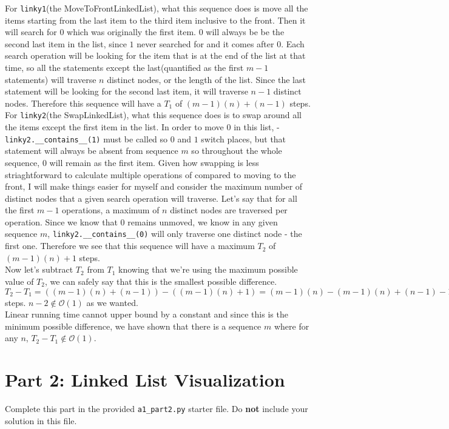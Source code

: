 \documentclass[fontsize=11pt]{article}
\begin{document}
\begin{enumerate}
    For \texttt{linky1}(the MoveToFrontLinkedList), what this sequence does is move all the items starting from the last item to the third item inclusive to the front. Then it will search for $0$ which was originally the first item. $0$ will always be be the second last item in the list, since $1$ never searched for and it comes after $0$. Each search operation will be looking for the item that is at the end of the list at that time, so all the statements except the last(quantified as the first $m-1$ statements) will traverse $n$ distinct nodes, or the length of the list. Since the last statement will be looking for the second last item, it will traverse $n-1$ distinct nodes. Therefore this sequence will have a $T_1$ of $(m-1)(n) + (n-1)$ steps.\\

    For \texttt{linky2}(the SwapLinkedList), what this sequence does is to swap around all the items except the first item in the list. In order to move $0$ in this list, -\texttt{linky2.\_\_contains\_\_(1)} must be called so $0$ and $1$ switch places, but that statement will always be absent from sequence $m$ so throughout the whole sequence, $0$ will remain as the first item. Given how swapping is less striaghtforward to calculate multiple operations of compared to moving to the front, I will make things easier for myself and consider the maximum number of distinct nodes that a given search operation will traverse. Let's say that for all the first $m-1$ operations, a maximum of $n$ distinct nodes are traversed per operation. Since we know that $0$ remains unmoved, we know in any given sequence $m$, \texttt{linky2.\_\_contains\_\_(0)} will only traverse one distinct node - the first one. Therefore we see that this sequence will have a maximum $T_2$ of $(m-1)(n) + 1$ steps.\\

    Now let's subtract $T_2$ from $T_1$ knowing that we're using the maximum possible value of $T_2$, we can safely say that this is the smallest possible difference.\\
    $T_2 - T_1 = ((m-1)(n) + (n-1)) - ((m-1)(n) + 1) = (m-1)(n) - (m-1)(n) + (n-1) - 1 = n - 2$ steps.
    $n - 2 \notin \mathcal{O}(1)$ as we wanted.\\
    Linear running time cannot upper bound by a constant and since this is the minimum possible difference, we have shown that there is a sequence $m$ where for any $n$, $T_2 - T_1 \notin \mathcal{O}(1)$.

\end{enumerate}

\section*{Part 2: Linked List Visualization}
Complete this part in the provided \texttt{a1\_part2.py} starter file.
Do \textbf{not} include your solution in this file.
\end{document}
